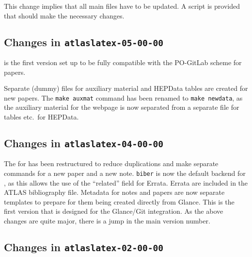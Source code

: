 This change implies that all main files have to be updated.
A script  is provided that should make the necessary changes.


\subsection{Changes in \texttt{atlaslatex-05-00-00}}
\label{sec:atlaslatex5}

 is the first version set up
to be fully compatible with the PO-GitLab scheme for papers.

Separate (dummy) files for auxiliary material and HEPData tables are created for new papers.
The \verb|make auxmat| command has been renamed to \verb|make newdata|,
as the auxiliary material for the webpage is now separated
from a separate file for tables etc.\ for HEPData.


\subsection{Changes in \texttt{atlaslatex-04-00-00}}
\label{sec:atlaslatex4}

 The  for 
has been restructured to reduce duplications and make separate commands for a new paper and a new note.
\texttt{biber} is now the default backend for ,
as this allows the use of the \enquote{related} field for Errata.
Errata are included in the ATLAS bibliography file.
Metadata for notes and papers are now separate templates to prepare for them being created directly from Glance.
This is the first version that is designed for the Glance/Git integration.
As the above changes are quite major, there is a jump in the main version number.


\subsection{Changes in \texttt{atlaslatex-02-00-00}}
\label{sec:atlaslatex2}

